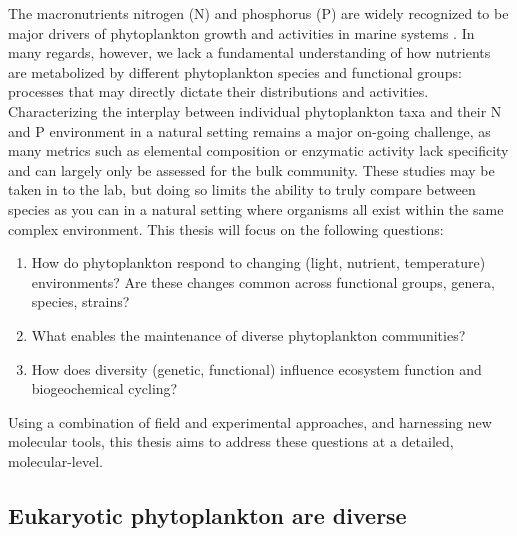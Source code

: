 The macronutrients nitrogen (N) and phosphorus (P) are widely recognized to be major drivers of phytoplankton growth and activities in marine systems \citep{}. In many regards, however, we lack a fundamental understanding of how nutrients are metabolized by different phytoplankton species and functional groups: processes that may directly dictate their distributions and activities. Characterizing the interplay between individual phytoplankton taxa and their N and P environment in a natural setting remains a major on-going challenge, as many metrics such as elemental composition or enzymatic activity lack specificity and can largely only be assessed for the bulk community. These studies may be taken in to the lab, but doing so limits the ability to truly compare between species as you can in a natural setting where organisms all exist within the same complex environment. This thesis will focus on the following questions:


\begin{enumerate}
  \item How do phytoplankton respond to changing (light, nutrient, temperature) environments? Are these changes common across functional groups, genera, species, strains? 
  \item What enables the maintenance of diverse phytoplankton communities? 
  \item How does diversity (genetic, functional) influence ecosystem function and biogeochemical cycling? 
      
\end{enumerate}

Using a combination of field and experimental approaches, and harnessing new molecular tools, this thesis aims to address these questions at a detailed, molecular-level. 

\subsection{Eukaryotic phytoplankton are diverse}



